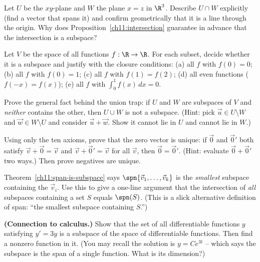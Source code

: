 \begin{exercise}\label{ch11:ex-intersection}
Let $U$ be the $xy$-plane and $W$ the plane $x = z$ in $\R^3$. Describe $U \cap W$
explicitly (find a vector that spans it) and confirm geometrically that it is a line
through the origin. Why does Proposition~\ref{ch11:intersection} guarantee in advance that
the intersection is a subspace?
\end{exercise}

\begin{exercise}\label{ch11:ex-functions}
Let $V$ be the space of all functions $f:\R\to\R$. For each subset, decide whether it is a
subspace and justify with the closure conditions:
(a) all $f$ with $f(0) = 0$; \quad (b) all $f$ with $f(0) = 1$;
(c) all $f$ with $f(1) = f(2)$; \quad (d) all even functions ($f(-x)=f(x)$);
(e) all $f$ with $\int_0^1 f(x)\,dx = 0$.
\end{exercise}

\begin{exercise}\label{ch11:ex-union-proof}
Prove the general fact behind the union trap: if $U$ and $W$ are subspaces of $V$ and
\emph{neither} contains the other, then $U \cup W$ is not a subspace.
(Hint: pick $\vec{u}\in U\setminus W$ and $\vec{w}\in W\setminus U$ and consider
$\vec{u}+\vec{w}$. Show it cannot lie in $U$ and cannot lie in $W$.)
\end{exercise}

\begin{exercise}\label{ch11:ex-axiom-derive}
Using only the ten axioms, prove that the zero vector is unique: if $\vec{0}$ and
$\vec{0}'$ both satisfy $\vec{v}+\vec{0}=\vec{v}$ and $\vec{v}+\vec{0}'=\vec{v}$ for all
$\vec{v}$, then $\vec{0}=\vec{0}'$. (Hint: evaluate $\vec{0}+\vec{0}'$ two ways.) Then
prove negatives are unique.
\end{exercise}

\begin{exercise}\label{ch11:ex-smallest}
Theorem~\ref{ch11:span-is-subspace} says $\spn\{\vec{v}_1,\dots,\vec{v}_k\}$ is the
\emph{smallest} subspace containing the $\vec{v}_i$. Use this to give a one-line argument
that the intersection of \emph{all} subspaces containing a set $S$ equals $\spn(S)$. (This
is a slick alternative definition of span: ``the smallest subspace containing $S$.'')
\end{exercise}

\begin{exercise}\label{ch11:ex-de-subspace}
\textbf{(Connection to calculus.)} Show that the set of all differentiable functions $y$
satisfying $y' = 3y$ is a subspace of the space of differentiable functions. Then find a
nonzero function in it. (You may recall the solution is $y = Ce^{3t}$ -- which says the
subspace is the span of a single function. What is its dimension?)
\end{exercise}
